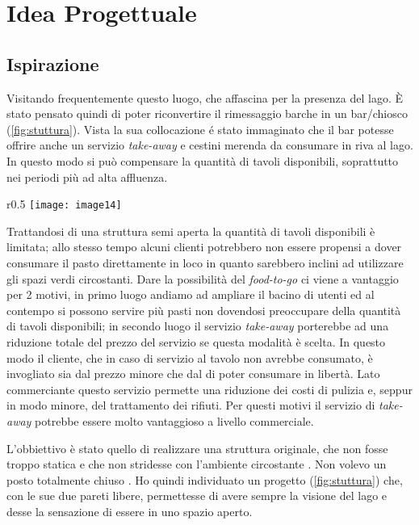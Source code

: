\section{Idea Progettuale}

\subsection{Ispirazione}

Visitando frequentemente questo luogo, che affascina per la presenza del lago. È stato pensato quindi di poter riconvertire il rimessaggio barche in un bar/chiosco (\cref{fig:stuttura}). Vista la sua collocazione é stato immaginato che il bar potesse offrire anche un servizio \textit{take-away} e cestini merenda da consumare in riva al lago. In questo modo si può compensare la quantità di tavoli disponibili, soprattutto nei periodi più ad alta affluenza. 

\begin{wrapfigure}[18]{r}{0.5\textwidth}
	\centering
	\texttt{[image: image14]}
	\caption{Struttura}
	\label{fig:stuttura}
\end{wrapfigure}

Trattandosi di una struttura semi aperta la quantità di tavoli disponibili è limitata; allo stesso tempo alcuni clienti potrebbero non essere propensi a dover consumare il pasto direttamente in loco in quanto sarebbero inclini ad utilizzare gli spazi verdi circostanti. Dare la possibilità del \textit{food-to-go} ci viene a vantaggio per 2 motivi, in primo luogo andiamo ad ampliare il bacino di utenti ed al contempo si possono servire più pasti non dovendosi preoccupare della quantità di tavoli disponibili; in secondo luogo il servizio \textit{take-away} porterebbe ad una riduzione totale del prezzo del servizio se questa modalità è scelta. In questo modo il cliente, che in caso di servizio al tavolo non avrebbe consumato, è invogliato sia dal prezzo minore che dal  di poter consumare in libertà. Lato commerciante questo servizio permette una riduzione dei costi di pulizia e, seppur in modo minore, del trattamento dei rifiuti.  Per questi motivi il servizio di \textit{take-away} potrebbe essere molto vantaggioso a livello commerciale.

L'obbiettivo è stato quello di realizzare una struttura  originale, che non fosse troppo statica e che non  stridesse con l’ambiente circostante . Non volevo un posto totalmente chiuso . Ho quindi individuato un progetto (\cref{fig:stuttura}) che,  con  le sue due  pareti libere,  permettesse di avere sempre la visione del lago e desse la sensazione di essere in uno spazio aperto. 

